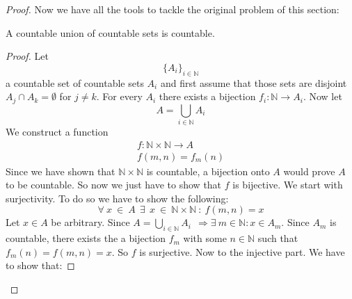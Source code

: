 \documentclass{article}
\theoremstyle{definition}
\begin{document}
\begin{proof}
Now we have all the tools to tackle the original problem of this section:
\begin{theorem}
    A countable union of countable sets is countable.
\end{theorem}
\begin{proof}
    Let 
    \begin{equation}
        \{ A_i \}_{i\in \mathbb{N}}
    \end{equation}
    a countable set of countable sets $A_i$ and first assume that those sets are disjoint $A_j \cap A_k = \emptyset$ for $j \neq k$. For every $A_i$ there exists a bijection $f_i:\mathbb{N} \longrightarrow A_i$. Now let
    \begin{equation}
        A = \bigcup _{i\in \mathbb{N}} A_i
    \end{equation}
    We construct a function
    \begin{align}
        f:\mathbb{N} \times \mathbb{N} \longrightarrow A \\
        f(m,n) = f_m(n)
    \end{align}
    Since we have shown that $\mathbb{N} \times \mathbb{N}$ is countable, a bijection onto $A$ would prove $A$ to be countable. So now we just have to show that $f$ is bijective.
    \newline
    \newline 
    We start with surjectivity. To do so we have to show the following:
    \begin{equation}
        \forall \: x \:  \in \: A \: \: \exists \: \: x \: \in\: \mathbb{N} \times \mathbb{N} \: : \: f(m,n) = x
    \end{equation}
    Let $x \in A $ be arbitrary. Since $ A = \bigcup _{i\in \mathbb{N}} A_i  \: \: \Rightarrow \exists \: m\in \mathbb{N}: x \in A_m$. Since $A_m$ is countable, there exists the a bijection $f_m$ with some $n \in \mathbb{N}$ such that $f_m(n)=f(m,n)=x$. So $f$ is surjective.
    \newline
    \newline
    \newline
    \newline 
    Now to the injective part. We have to show that:


\end{proof}
\end{proof}
\end{document}
